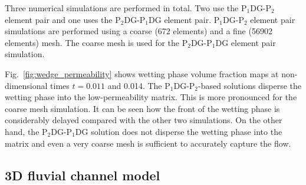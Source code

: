 \documentclass[times]{fldauth}
\newcommand{\PN}[2][error]{P$_{#1}$DG-P$_{#2}$}
\begin{document}
Three numerical simulations are performed in total. Two use the
\PN[1]{2} element pair and one uses the \PN[2]{1}DG element pair.
\PN[1]{2} element pair simulations are performed using a coarse (672
elements) and a fine (56902 elements) mesh. The coarse mesh is used
for the \PN[2]{1}DG element pair simulation.

Fig.~\ref{fig:wedge_permeability} shows wetting phase volume fraction
maps at non-dimensional times $t=0.011$ and 0.014. The \PN[1]{2}-based
solutions disperse the wetting phase into the low-permeability
matrix. This is more pronounced for the coarse mesh simulation. It can
be seen how the front of the wetting phase is considerably delayed
compared with the other two simulations. On the other hand, the
\PN[2]{1}DG solution does not disperse the wetting phase into the
matrix and even a very coarse mesh is sufficient to accurately capture
the flow.

\subsection{3D fluvial channel model}\label{res5}
\end{document}
